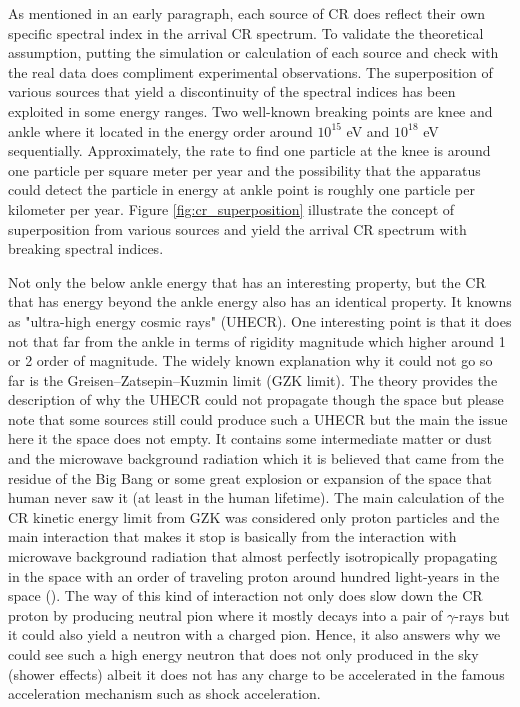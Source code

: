 As mentioned in an early paragraph, each source of CR does reflect their
own specific spectral index in the arrival CR spectrum.
To validate the theoretical assumption, putting the simulation or calculation of each source and check
with the real data does compliment experimental observations.
The superposition of various sources that yield a 
discontinuity of the spectral indices has been exploited
in some energy ranges. Two well-known breaking points 
are knee and ankle where it located in the energy order around $10^{15}$ eV and $10^{18}$ eV sequentially.
Approximately, the rate to find one particle at the knee
is around one particle per square meter per year and 
the possibility that the apparatus could detect the particle
in energy at ankle point is roughly one particle per 
kilometer per year. Figure \ref{fig:cr_superposition} illustrate
the concept of superposition from various sources and 
yield the arrival CR spectrum with breaking spectral indices. 


Not only the below ankle energy that has an interesting property, but the CR that has energy beyond the ankle energy
also has an identical property. It knowns as "ultra-high
energy cosmic rays" (UHECR). One interesting point is that it does not that far from the ankle in terms of rigidity magnitude
which higher around 1 or 2 order of magnitude. The widely known 
explanation why it could not go so far is the
Greisen–Zatsepin–Kuzmin limit (GZK limit).
The theory provides the description of why the UHECR
could not propagate though the space but please note that
some sources still could produce such a UHECR but the main
the issue here it the space does not empty. It contains some 
intermediate matter or dust and the microwave background radiation
which it is believed that came from the residue of the 
Big Bang or some great explosion or expansion of the space that 
human never saw it (at least in the human lifetime).
The main calculation of the CR kinetic energy limit from GZK 
was considered only proton particles and the main interaction
that makes it stop is basically from the interaction with 
microwave background radiation that almost perfectly
isotropically propagating in the space with an order of 
traveling proton around hundred light-years in the space
(\cite{gzk_cr_limit}). The way of this kind of interaction 
not only does slow down the CR proton by producing 
neutral pion where it mostly decays into a pair of $\gamma$-rays
but it could also yield a neutron with 
a charged pion. Hence, it also answers why we could 
see such a high energy neutron that does not only 
produced in the sky (shower effects) albeit it does not
has any charge to be accelerated in the famous 
acceleration mechanism such as shock acceleration.


